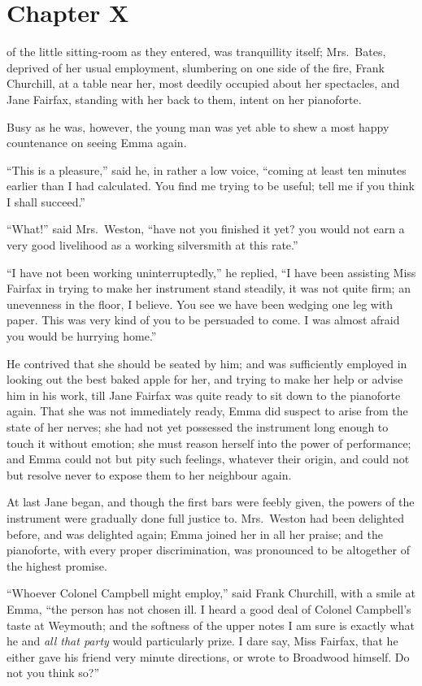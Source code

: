 \chapter{Chapter X}


 of the little sitting-room as they entered,
was tranquillity itself; Mrs.\ Bates, deprived of her usual employment,
slumbering on one side of the fire, Frank Churchill, at a table
near her, most deedily occupied about her spectacles, and Jane Fairfax,
standing with her back to them, intent on her pianoforte.

Busy as he was, however, the young man was yet able to shew a most
happy countenance on seeing Emma again.

``This is a pleasure,'' said he, in rather a low voice, ``coming at
least ten minutes earlier than I had calculated.  You find me
trying to be useful; tell me if you think I shall succeed.''

``What!'' said Mrs.\ Weston, ``have not you finished it yet? you would
not earn a very good livelihood as a working silversmith at this rate.''

``I have not been working uninterruptedly,'' he replied, ``I have been
assisting Miss Fairfax in trying to make her instrument stand steadily,
it was not quite firm; an unevenness in the floor, I believe.
You see we have been wedging one leg with paper.  This was very kind
of you to be persuaded to come.  I was almost afraid you would be
hurrying home.''

He contrived that she should be seated by him; and was sufficiently
employed in looking out the best baked apple for her, and trying
to make her help or advise him in his work, till Jane Fairfax was
quite ready to sit down to the pianoforte again.  That she was not
immediately ready, Emma did suspect to arise from the state of her nerves;
she had not yet possessed the instrument long enough to touch it
without emotion; she must reason herself into the power of performance;
and Emma could not but pity such feelings, whatever their origin,
and could not but resolve never to expose them to her neighbour again.

At last Jane began, and though the first bars were feebly given,
the powers of the instrument were gradually done full justice to.
Mrs.\ Weston had been delighted before, and was delighted again;
Emma joined her in all her praise; and the pianoforte, with every
proper discrimination, was pronounced to be altogether of the
highest promise.

``Whoever Colonel Campbell might employ,'' said Frank Churchill,
with a smile at Emma, ``the person has not chosen ill.  I heard a good
deal of Colonel Campbell's taste at Weymouth; and the softness of the
upper notes I am sure is exactly what he and \emph{all that party} would
particularly prize.  I dare say, Miss Fairfax, that he either gave
his friend very minute directions, or wrote to Broadwood himself.
Do not you think so?''

